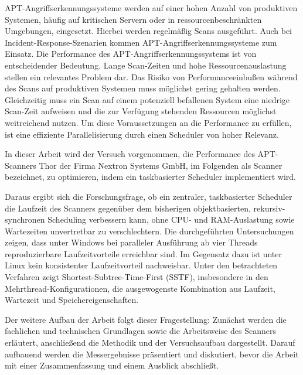 %
%
\begin{sloppypar}
\noindent \acs{APT}-Angriffs\-erkennungs\-systeme werden auf einer hohen Anzahl
von produktiven Systemen,
h\"aufig auf kritischen Servern
oder in ressourcen\-beschr\"ankten Umgebungen, eingesetzt.
Hierbei werden regelmäßig Scans ausgeführt.
Auch bei Incident-Response-Szenarien
kommen \acs{APT}-Angriffs\-erkennungs\-systeme zum Einsatz.
Die Performance des \acs{APT}-Angriffs\-erkennungs\-systems
ist von entscheidender Bedeutung.
Lange Scan-Zeiten und hohe Ressourcenauslastung
stellen ein relevantes Problem dar.
Das Risiko von Performanceeinbußen während des Scans
auf produktiven Systemen muss möglichst gering gehalten werden.
Gleichzeitig muss ein Scan auf einem potenziell befallenen System
eine niedrige Scan-Zeit aufweisen
und die zur Verfügung stehenden Ressourcen
möglichst weitreichend nutzen.
Um diese Voraussetzungen an die Performance zu erfüllen,
ist eine effiziente Parallelisierung durch einen Scheduler
von hoher Relevanz.

\vspace{7.56mm}

\noindent In dieser Arbeit wird der Versuch vorgenommen,
die Performance des \acs{APT}-Scanners Thor
der Firma Nextron Systems GmbH,
im Folgenden als Scanner bezeichnet, zu optimieren,
indem ein taskbasierter Scheduler implementiert wird.

\vspace{7.56mm}

\noindent Daraus ergibt sich die Forschungsfrage, ob ein zentraler, taskbasierter Scheduler die Laufzeit des Scanners gegenüber dem bisherigen objektbasierten, rekursiv-synchronen Scheduling verbessern kann, ohne \acs{CPU}- und \acs{RAM}-Auslastung sowie Wartezeiten unvertretbar zu verschlechtern. 
Die durchgeführten Untersuchungen zeigen, dass unter Windows bei paralleler Ausführung ab vier Threads reproduzierbare Laufzeitvorteile erreichbar sind. 
Im Gegensatz dazu ist unter Linux kein konsistenter Laufzeitvorteil nachweisbar.
Unter den betrachteten Verfahren zeigt Shortest-Subtree-Time-First (\acs{SSTF}), 
insbesondere in den Mehrthread-Konfigurationen, die ausgewogenste Kombination aus Laufzeit, Wartezeit und Speichereigenschaften.

\vspace{7.56mm}

\noindent Der weitere Aufbau der Arbeit folgt dieser Fragestellung: Zunächst werden die fachlichen und technischen Grundlagen sowie die Arbeitsweise des Scanners erläutert, anschließend die Methodik und der Versuchsaufbau dargestellt. Darauf aufbauend werden die Messergebnisse präsentiert und diskutiert, bevor die Arbeit mit einer Zusammenfassung und einem Ausblick abschließt.
\end{sloppypar}

